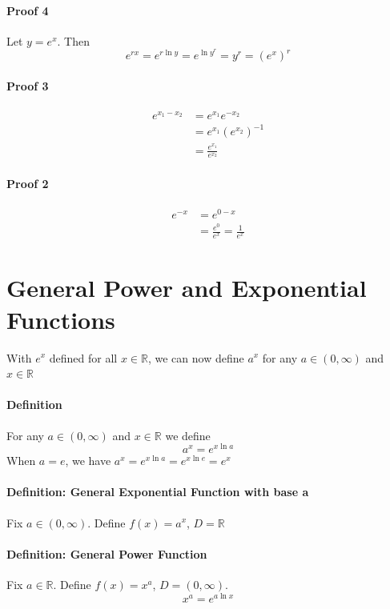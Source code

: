 \documentclass[12pt]{article}
\begin{document}
\paragraph{Proof 4}
Let $y = e^x$. Then
\[
    e^{rx} = e^{r \ln y} = e^{\ln y^r} = y^r = (e^x)^r
\]

\paragraph{Proof 3}
\begin{align*} 
    e^{x_1 - x_2} &= e^{x_1}e^{ - x_2} \\
    &= e^{x_1}(e^{x_2})^{ - 1} \\
    &= \frac{e^{x_1}}{e^{x_2}}
\end{align*}

\paragraph{Proof 2}
\begin{align*} 
    e^{ - x} &= e^{0 - x} \\
    &= \frac{e^0}{e^x} = \frac{1}{e^x}
\end{align*}

\section{General Power and Exponential Functions}
With $e^x$ defined for all $x \in \mathbb{R}$, we can now define $a^x$ for any $a \in (0, \infty)$ and $x \in \mathbb{R}$
\paragraph{Definition}
For any $a \in (0, \infty)$ and $x \in \mathbb{R}$ we define
\[
    a^x = e^{x \ln a}
\]
When $a = e$, we have $a^x = e^{x \ln a} = e^{x \ln e} = e^x$

\paragraph{Definition: General Exponential Function with base a}
Fix $a \in (0, \infty)$. Define $f(x) = a^x$, $D = \mathbb{R}$

\paragraph{Definition: General Power Function}
Fix $a \in \mathbb{R}$. Define $f(x) = x^a$, $D = (0, \infty)$. 
\[
    x^a = e^{a \ln x}
\]
\end{document}
